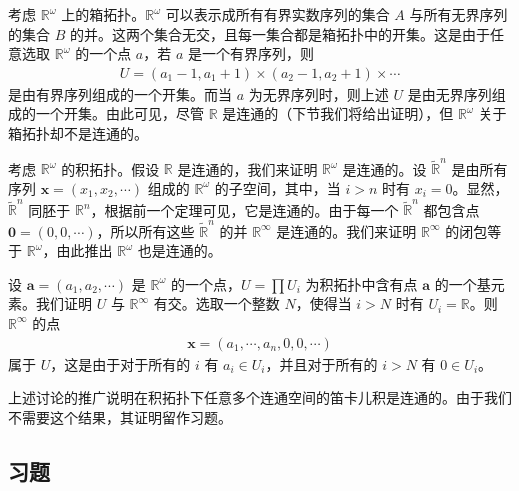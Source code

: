 \documentclass[../../main.tex]{subfiles}
\begin{document}
\begin{example}\label{example:ch03-box-disconnected}
考虑 $\mathbb{R}^{\omega}$ 上的箱拓扑。$\mathbb{R}^{\omega}$ 可以表示成所有有界实数序列的集合 $A$ 与所有无界序列的集合 $B$ 的并。这两个集合无交，且每一集合都是箱拓扑中的开集。这是由于任意选取 $\mathbb{R}^{\omega}$ 的一个点 $a$，若 $a$ 是一个有界序列，则
\begin{align*}
U=(a_{1}-1,a_{1}+1)\times(a_{2}-1,a_{2}+1)\times\cdots
\end{align*}
是由有界序列组成的一个开集。而当 $a$ 为无界序列时，则上述 $U$ 是由无界序列组成的一个开集。由此可见，尽管 $\mathbb{R}$ 是连通的（下节我们将给出证明），但 $\mathbb{R}^{\omega}$ 关于箱拓扑却不是连通的。
\end{example}

\begin{example}\label{example:ch03-product-connected}
考虑 $\mathbb{R}^{\omega}$ 的积拓扑。假设 $\mathbb{R}$ 是连通的，我们来证明 $\mathbb{R}^{\omega}$ 是连通的。设 $\widetilde{\mathbb{R}}^{n}$ 是由所有序列 $\boldsymbol{x}=(x_{1},x_{2},\cdots)$ 组成的 $\mathbb{R}^{\omega}$ 的子空间，其中，当 $i>n$ 时有 $x_{i}=0$。显然，$\widetilde{\mathbb{R}}^{n}$ 同胚于 $\mathbb{R}^{n}$，根据前一个定理可见，它是连通的。由于每一个 $\widetilde{\mathbb{R}}^{n}$ 都包含点 $\boldsymbol{0}=(0,0,\cdots)$，所以所有这些 $\widetilde{\mathbb{R}}^{n}$ 的并 $\mathbb{R}^{\infty}$ 是连通的。我们来证明 $\mathbb{R}^{\infty}$ 的闭包等于 $\mathbb{R}^{\omega}$，由此推出 $\mathbb{R}^{\omega}$ 也是连通的。

设 $\boldsymbol{a}=(a_{1},a_{2},\cdots)$ 是 $\mathbb{R}^{\omega}$ 的一个点，$U=\prod U_{i}$ 为积拓扑中含有点 $\boldsymbol{a}$ 的一个基元素。我们证明 $U$ 与 $\mathbb{R}^{\infty}$ 有交。选取一个整数 $N$，使得当 $i>N$ 时有 $U_{i}=\mathbb{R}$。则 $\mathbb{R}^{\infty}$ 的点
\begin{align*}
\boldsymbol{x}=(a_{1},\cdots,a_{n},0,0,\cdots)
\end{align*}
属于 $U$，这是由于对于所有的 $i$ 有 $a_{i}\in U_{i}$，并且对于所有的 $i>N$ 有 $0\in U_{i}$。
\end{example}

上述讨论的推广说明在积拓扑下任意多个连通空间的笛卡儿积是连通的。由于我们不需要这个结果，其证明留作习题。

\subsection*{习题}
\end{document}
